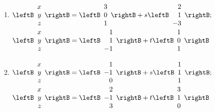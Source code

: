 \begin{multicols}{2}
\begin{ex}
\begin{enumerate}[label={\alph*.}]
\item 
$\leftB
\begin{array}{r}
x\\
y\\
z
\end{array}
\rightB
=
\leftB
\begin{array}{r}
3\\
0\\
1
\end{array}
\rightB
+s
\leftB
\begin{array}{r}
2\\
1\\
-3
\end{array}
\rightB; $ \\ $
\leftB
\begin{array}{r}
x\\
y\\
z
\end{array}
\rightB
=
\leftB
\begin{array}{r}
1\\
1\\
-1
\end{array}
\rightB
+t
\leftB
\begin{array}{r}
1\\
0\\
1
\end{array}
\rightB$

\item 
$\leftB
\begin{array}{r}
x\\
y\\
z
\end{array}
\rightB
=
\leftB
\begin{array}{r}
1\\
-1\\
0
\end{array}
\rightB
+s
\leftB
\begin{array}{r}
1\\
1\\
1
\end{array}
\rightB; $ \\ $
\leftB
\begin{array}{r}
x\\
y\\
z
\end{array}
\rightB
=
\leftB
\begin{array}{r}
2\\
-1\\
3
\end{array}
\rightB
+t
\leftB
\begin{array}{r}
3\\
1\\
0
\end{array}
\rightB$


\end{enumerate}
\end{ex}
\end{multicols}
